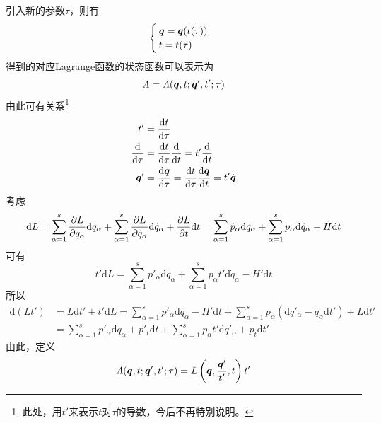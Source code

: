 引入新的参数$\tau$，则有
\begin{equation*}
	\begin{cases}
		\boldsymbol{q} = \boldsymbol{q}(t(\tau)) \\
		t = t(\tau)
	\end{cases}
\end{equation*}
得到的对应Lagrange函数的状态函数可以表示为
\begin{equation*}
	\mathnormal{\Lambda} = \mathnormal{\Lambda}(\boldsymbol{q},t;\boldsymbol{q}',t';\tau)
\end{equation*}
由此可有关系\footnote{此处，用$t'$来表示$t$对$\tau$的导数，今后不再特别说明。}
\begin{align*}
	t' &= \frac{\mathrm{d} t}{\mathrm{d} \tau} \\
	\frac{\mathrm{d}}{\mathrm{d} \tau} & = \frac{\mathrm{d} t}{\mathrm{d} \tau} \frac{\mathrm{d}}{\mathrm{d} t} = t' \frac{\mathrm{d}}{\mathrm{d} t} \\
	\boldsymbol{q}' &= \frac{\mathrm{d} \boldsymbol{q}}{\mathrm{d} \tau} = \frac{\mathrm{d} t}{\mathrm{d} \tau} \frac{\mathrm{d} \boldsymbol{q}}{\mathrm{d} t} = t' \dot{\boldsymbol{q}}
\end{align*}
考虑
\begin{equation*}
	\mathrm{d} L = \sum_{\alpha=1}^s \frac{\partial L}{\partial q_\alpha} \mathrm{d} q_\alpha + \sum_{\alpha=1}^s \frac{\partial L}{\partial \dot{q}_\alpha} \mathrm{d} \dot{q}_\alpha + \frac{\partial L}{\partial t} \mathrm{d} t = \sum_{\alpha=1}^s \dot{p}_\alpha \mathrm{d} q_\alpha + \sum_{\alpha=1}^s p_\alpha \mathrm{d} \dot{q}_\alpha - \dot{H} \mathrm{d} t
\end{equation*}
可有
\begin{equation*}
	t'\mathrm{d} L = \sum_{\alpha=1}^s p'_\alpha \mathrm{d} q_\alpha + \sum_{\alpha=1}^s p_\alpha t' \mathrm{d} \dot{q}_\alpha - H' \mathrm{d} t
\end{equation*}
所以
\begin{align}
	\mathrm{d} (Lt') & = L\mathrm{d} t' + t'\mathrm{d} L = \sum_{\alpha=1}^s p'_\alpha \mathrm{d} q_\alpha - H' \mathrm{d} t + \sum_{\alpha=1}^s p_\alpha (\mathrm{d} q'_\alpha - \dot{q}_\alpha \mathrm{d} t') + L\mathrm{d} t' \nonumber \\
	& = \sum_{\alpha=1}^s p'_\alpha \mathrm{d} q_\alpha + p'_t \mathrm{d} t + \sum_{\alpha=1}^s p_\alpha t' \mathrm{d} q'_\alpha + p_t\mathrm{d} t'
	\label{推广的Lagrange函数中间步骤}
\end{align}
由此，定义
\begin{equation*}
	\mathnormal{\Lambda}(\boldsymbol{q},t;\boldsymbol{q}',t';\tau) = L \left(\boldsymbol{q},\frac{\boldsymbol{q}'}{t'},t\right) t'
\end{equation*}
